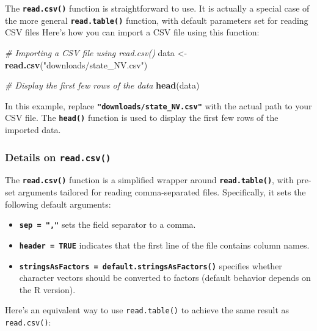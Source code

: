 \documentclass[
]{book}
\newenvironment{Shaded}{\begin{snugshade}}{\end{snugshade}}
\newcommand{\CommentTok}[1]{\textcolor[rgb]{0.56,0.35,0.01}{\textit{#1}}}
\newcommand{\FunctionTok}[1]{\textcolor[rgb]{0.13,0.29,0.53}{\textbf{#1}}}
\newcommand{\NormalTok}[1]{#1}
\newcommand{\OtherTok}[1]{\textcolor[rgb]{0.56,0.35,0.01}{#1}}
\newcommand{\StringTok}[1]{\textcolor[rgb]{0.31,0.60,0.02}{#1}}
\providecommand{\tightlist}{%
  \setlength{\itemsep}{0pt}\setlength{\parskip}{0pt}}
\begin{document}
The \textbf{\texttt{read.csv()}} function is straightforward to use. It is actually a special case of the more general \textbf{\texttt{read.table()}} function, with default parameters set for reading CSV files Here's how you can import a CSV file using this function:

\begin{Shaded}
\begin{Highlighting}[]
\CommentTok{\# Importing a CSV file using read.csv()}
\NormalTok{data }\OtherTok{\textless{}{-}} \FunctionTok{read.csv}\NormalTok{(}\StringTok{"downloads/state\_NV.csv"}\NormalTok{)}

\CommentTok{\# Display the first few rows of the data}
\FunctionTok{head}\NormalTok{(data)}
\end{Highlighting}
\end{Shaded}

In this example, replace \textbf{\texttt{"downloads/state\_NV.csv"}} with the actual path to your CSV file. The \textbf{\texttt{head()}} function is used to display the first few rows of the imported data.

\hypertarget{details-on-read.csv}{%
\subsubsection*{\texorpdfstring{Details on \texttt{read.csv()}}{Details on read.csv()}}\label{details-on-read.csv}}

The \textbf{\texttt{read.csv()}} function is a simplified wrapper around \textbf{\texttt{read.table()}}, with pre-set arguments tailored for reading comma-separated files. Specifically, it sets the following default arguments:

\begin{itemize}
\tightlist
\item
  \textbf{\texttt{sep\ =\ ","}} sets the field separator to a comma.
\item
  \textbf{\texttt{header\ =\ TRUE}} indicates that the first line of the file contains column names.
\item
  \textbf{\texttt{stringsAsFactors\ =\ default.stringsAsFactors()}} specifies whether character vectors should be converted to factors (default behavior depends on the R version).
\end{itemize}

Here's an equivalent way to use \texttt{read.table()} to achieve the same result as \texttt{read.csv()}:
\end{document}
